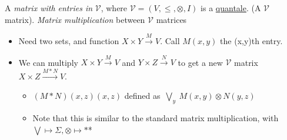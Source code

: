 A \emph{matrix with entries in} $\mathcal{V}$, where $\mathcal{V}=(V, \leq, \otimes, I)$ is a \hyperref[D2.90]{quantale}. (A $\mathcal{V}$ matrix). \emph{Matrix multiplication} between $\mathcal{V}$ matrices

\begin{itemize}
    \item  Need two sets, and function $X \times Y \xrightarrow{M} V$. Call $M(x,y)$ the (x,y)th entry.
    \item We can multiply $X \times Y \xrightarrow{M} V$ and $Y \times Z \xrightarrow{N} V$ to get a new $\mathcal{V}$ matrix $X \times Z \xrightarrow{M*N} V$.
          \begin{itemize}
            \item $(M*N)(x,z)(x,z)$ defined as \,$\bigvee_y\ M(x,y)\otimes N(y,z)$\,
            \item Note that this is similar to the standard matrix multiplication, with $\bigvee \mapsto \Sigma, \otimes \mapsto *$*
          \end{itemize}
  \end{itemize}
